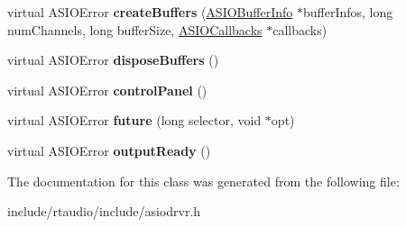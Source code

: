 \begin{DoxyCompactItemize}
\item 
virtual A\+S\+I\+O\+Error {\bfseries create\+Buffers} (\hyperlink{struct_a_s_i_o_buffer_info}{A\+S\+I\+O\+Buffer\+Info} $\ast$buffer\+Infos, long num\+Channels, long buffer\+Size, \hyperlink{struct_a_s_i_o_callbacks}{A\+S\+I\+O\+Callbacks} $\ast$callbacks)\hypertarget{class_asio_driver_aa1ef8816d083d41f52281d0d7e3bb725}{}\label{class_asio_driver_aa1ef8816d083d41f52281d0d7e3bb725}

\item 
virtual A\+S\+I\+O\+Error {\bfseries dispose\+Buffers} ()\hypertarget{class_asio_driver_a9442c08dc9a7d18194b7b9984e78a2f5}{}\label{class_asio_driver_a9442c08dc9a7d18194b7b9984e78a2f5}

\item 
virtual A\+S\+I\+O\+Error {\bfseries control\+Panel} ()\hypertarget{class_asio_driver_abca405b72121e0bf03afaba2444179f9}{}\label{class_asio_driver_abca405b72121e0bf03afaba2444179f9}

\item 
virtual A\+S\+I\+O\+Error {\bfseries future} (long selector, void $\ast$opt)\hypertarget{class_asio_driver_af6d3c81e26cec1dee125226849bf92a5}{}\label{class_asio_driver_af6d3c81e26cec1dee125226849bf92a5}

\item 
virtual A\+S\+I\+O\+Error {\bfseries output\+Ready} ()\hypertarget{class_asio_driver_a5c57342314a4882f0c966e226a4de2c9}{}\label{class_asio_driver_a5c57342314a4882f0c966e226a4de2c9}

\end{DoxyCompactItemize}


The documentation for this class was generated from the following file\+:\begin{DoxyCompactItemize}
\item 
include/rtaudio/include/asiodrvr.\+h\end{DoxyCompactItemize}
